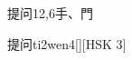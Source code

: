 \begin{entry}{提问}{12,6}{⼿、⾨}
  \begin{phonetics}{提问}{ti2wen4}[][HSK 3]
  \end{phonetics}
\end{entry}
